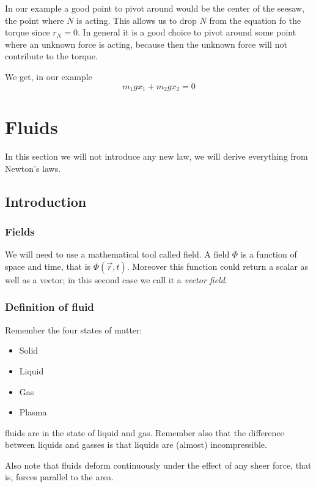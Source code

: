 \documentclass[12pt]{extarticle}
\begin{document}
In our example a good point to pivot around would be the center of the seesaw, the point where $N$ is acting.
This allows us to drop $N$ from the equation fo the torque since $r_N = 0$.
In general it is a good choice to pivot around some point where an unknown force is acting, because then the unknown force will not contribute to the torque.

We get, in our example
\begin{equation}
    m_1 g x_1 + m_2 g x_2 = 0
\end{equation}

\section{Fluids}

In this section we will not introduce any new law, we will derive everything from Newton's laws.

\subsection{Introduction}

\subsubsection{Fields}

We will need to use a mathematical tool called field.
A field $\Phi$ is a function of space and time, that is $\Phi(\vec{r}, t)$.
Moreover this function could return a scalar as well as a vector; in this second case we call it a \emph{vector field}.

\subsubsection{Definition of fluid}

Remember the four states of matter:
\begin{itemize}
    \item Solid
    \item Liquid
    \item Gas
    \item Plasma
\end{itemize}
fluids are in the state of liquid and gas.
Remember also that the difference between liquids and gasses is that liquids are (almost) incompressible.

Also note that fluids deform continuously under the effect of any sheer force, that is, forces parallel to the area.
\end{document}
